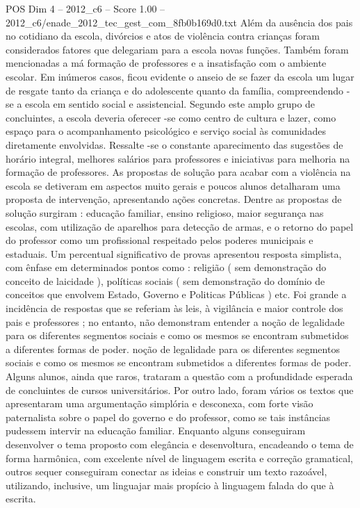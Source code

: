\begin{textsample}{POS Dim 4 – 2012\_c6 – Score 1.00 – 2012\_c6/enade\_2012\_tec\_gest\_com\_8fb0b169d0.txt}
Além da ausência dos pais no cotidiano da escola, divórcios e atos de violência contra crianças foram considerados fatores que delegariam para a escola novas funções.
Também foram mencionadas a má formação de professores e a insatisfação com o ambiente escolar.
Em inúmeros casos, ficou evidente o anseio de se fazer da escola um lugar de resgate tanto da criança e do adolescente quanto da família, compreendendo -se a escola em sentido social e assistencial.
Segundo este amplo grupo de concluintes, a escola deveria oferecer -se como centro de cultura e lazer, como espaço para o acompanhamento psicológico e serviço social às comunidades diretamente envolvidas.
Ressalte -se o constante aparecimento das sugestões de horário integral, melhores salários para professores e iniciativas para melhoria na formação de professores.
As propostas de solução para acabar com a violência na escola se detiveram em aspectos muito gerais e poucos alunos detalharam uma proposta de intervenção, apresentando ações concretas.
Dentre as propostas de solução surgiram : educação familiar, ensino religioso, maior segurança nas escolas, com utilização de aparelhos para detecção de armas, e o retorno do papel do professor como um profissional respeitado pelos poderes municipais e estaduais.
Um percentual significativo de provas apresentou resposta simplista, com ênfase em determinados pontos como : religião ( sem demonstração do conceito de laicidade ), políticas sociais ( sem demonstração do domínio de conceitos que envolvem Estado, Governo e Politicas Públicas ) etc.
Foi grande a incidência de respostas que se referiam às leis, à vigilância e maior controle dos pais e professores ; no entanto, não demonstram entender a noção de legalidade para os diferentes segmentos sociais e como os mesmos se encontram submetidos a diferentes formas de poder. noção de legalidade para os diferentes segmentos sociais e como os mesmos se encontram submetidos a diferentes formas de poder.
Alguns alunos, ainda que raros, trataram a questão com a profundidade esperada de concluintes de cursos universitários.
Por outro lado, foram vários os textos que apresentaram uma argumentação simplória e desconexa, com forte visão paternalista sobre o papel do governo e do professor, como se tais instâncias pudessem intervir na educação familiar.
Enquanto alguns conseguiram desenvolver o tema proposto com elegância e desenvoltura, encadeando o tema de forma harmônica, com excelente nível de linguagem escrita e correção gramatical, outros sequer conseguiram conectar as ideias e construir um texto razoável, utilizando, inclusive, um linguajar mais propício à linguagem falada do que à escrita.

\end{textsample}
